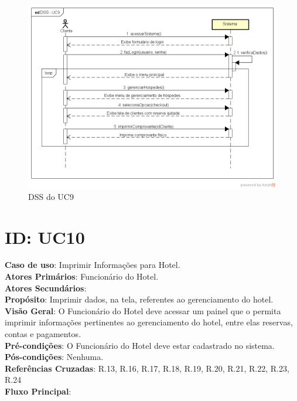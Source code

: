 \documentclass[notitlepage]{article}
\begin{document}
\begin{figure}[!htbp]
	\centering
  \includegraphics[scale=0.65]{UC9.png}
  \caption{DSS do UC9}
  \label{fig:UC9}
\end{figure}

\clearpage

\section{ID: UC10}
\noindent\textbf{Caso de uso}: Imprimir Informações para Hotel.\\
\textbf{Atores Primários}: Funcionário do Hotel. \\
\textbf{Atores Secundários}: \\
\textbf{Propósito}: Imprimir dados, na tela, referentes ao gerenciamento do hotel.\\
\textbf{Visão Geral}: O Funcionário do Hotel deve acessar um painel que o permita imprimir informações pertinentes ao gerenciamento do hotel, entre elas reservas, contas e pagamentos.\\
\textbf{Pré-condições}: O Funcionário do Hotel deve estar cadastrado no sistema.\\
\textbf{Pós-condições}: Nenhuma.\\
\textbf{Referências Cruzadas}: R.13, R.16, R.17, R.18, R.19, R.20, R.21, R.22, R.23, R.24\\
\newline
\textbf{Fluxo Principal}:\\
\end{document}
